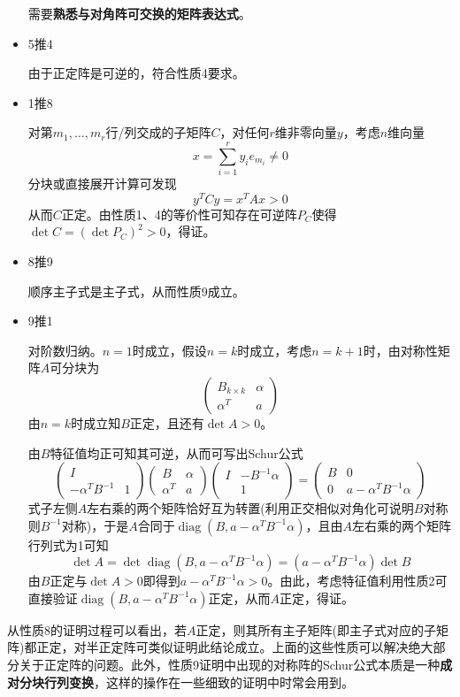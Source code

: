 \documentclass[a4paper,UTF8,fontset=windows]{ctexart}
\DeclareMathOperator{\diag}{diag}
\newcommand*{\note}{\noindent *}
\begin{document}
\begin{itemize}
    \note 需要\textbf{熟悉与对角阵可交换的矩阵表达式}。

    \item 5推4

    由于正定阵是可逆的，符合性质4要求。

    \item 1推8

    对第$m_1,\dots,m_r$行/列交成的子矩阵$C$，对任何$r$维非零向量$y$，考虑$n$维向量
    $$x=\sum_{i=1}^ry_ie_{m_i}\ne0$$
    分块或直接展开计算可发现
    $$y^TCy=x^TAx>0$$
    从而$C$正定。由性质1、4的等价性可知存在可逆阵$P_C$使得$\det C=(\det P_C)^2>0$，得证。

    \item 8推9
    
    顺序主子式是主子式，从而性质9成立。

    \item 9推1

    对阶数归纳。$n=1$时成立，假设$n=k$时成立，考虑$n=k+1$时，由对称性矩阵$A$可分块为
    $$\begin{pmatrix}B_{k\times k}&\alpha\\\alpha^T&a\end{pmatrix}$$
    由$n=k$时成立知$B$正定，且还有$\det A>0$。

    由$B$特征值均正可知其可逆，从而可写出Schur公式
    $$\begin{pmatrix}I&\\-\alpha^TB^{-1}&1\end{pmatrix}\begin{pmatrix}B&\alpha\\\alpha^T&a\end{pmatrix}\begin{pmatrix}I&-B^{-1}\alpha\\ &1\end{pmatrix}=\begin{pmatrix}B&0\\0&a-\alpha^TB^{-1}\alpha\end{pmatrix}$$
    式子左侧$A$左右乘的两个矩阵恰好互为转置(利用正交相似对角化可说明$B$对称则$B^{-1}$对称)，于是$A$合同于$\diag(B,a-\alpha^TB^{-1}\alpha)$，且由$A$左右乘的两个矩阵行列式为1可知
    $$\det A=\det\diag(B,a-\alpha^TB^{-1}\alpha)=(a-\alpha^TB^{-1}\alpha)\det B$$
    由$B$正定与$\det A>0$即得到$a-\alpha^TB^{-1}\alpha>0$。由此，考虑特征值利用性质2可直接验证$\diag(B,a-\alpha^TB^{-1}\alpha)$正定，从而$A$正定，得证。
\end{itemize}

从性质8的证明过程可以看出，若$A$正定，则其所有主子矩阵(即主子式对应的子矩阵)都正定，对半正定阵可类似证明此结论成立。上面的这些性质可以解决绝大部分关于正定阵的问题。此外，性质9证明中出现的对称阵的Schur公式本质是一种\textbf{成对分块行列变换}，这样的操作在一些细致的证明中时常会用到。
\end{document}
